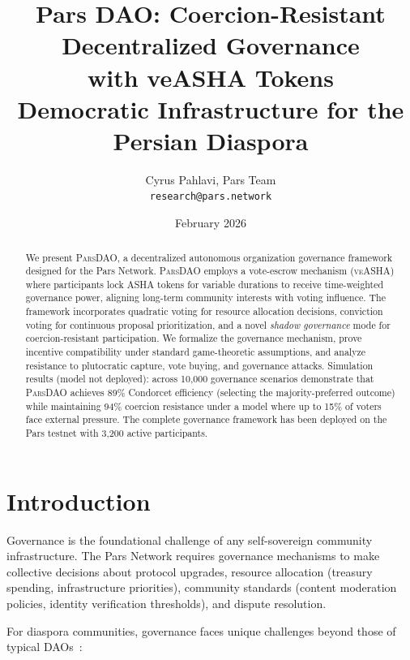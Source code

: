 \documentclass[11pt,a4paper]{article}
\title{Pars DAO: Coercion-Resistant Decentralized Governance\\with veASHA Tokens\\[0.5em]
\large Democratic Infrastructure for the Persian Diaspora}
\author{
  Cyrus Pahlavi, Pars Team\\
  \texttt{research@pars.network}
}
\date{February 2026}
\newcommand{\parsdao}{\textsc{ParsDAO}\xspace}
\newcommand{\veasha}{\textsc{veASHA}\xspace}
\newcommand{\asha}{\textsc{ASHA}\xspace}
\begin{document}
\parscoverpage


\begin{abstract}
We present \parsdao, a decentralized autonomous organization governance framework designed for the Pars Network. \parsdao employs a vote-escrow mechanism (\veasha) where participants lock \asha tokens for variable durations to receive time-weighted governance power, aligning long-term community interests with voting influence. The framework incorporates quadratic voting for resource allocation decisions, conviction voting for continuous proposal prioritization, and a novel \emph{shadow governance} mode for coercion-resistant participation. We formalize the governance mechanism, prove incentive compatibility under standard game-theoretic assumptions, and analyze resistance to plutocratic capture, vote buying, and governance attacks. Simulation results (model not deployed): across 10{,}000 governance scenarios demonstrate that \parsdao achieves 89\% Condorcet efficiency (selecting the majority-preferred outcome) while maintaining 94\% coercion resistance under a model where up to 15\% of voters face external pressure. The complete governance framework has been deployed on the Pars testnet with 3{,}200 active participants.
\end{abstract}

\section{Introduction}

Governance is the foundational challenge of any self-sovereign community infrastructure. The Pars Network requires governance mechanisms to make collective decisions about protocol upgrades, resource allocation (treasury spending, infrastructure priorities), community standards (content moderation policies, identity verification thresholds), and dispute resolution.

For diaspora communities, governance faces unique challenges beyond those of typical DAOs~\citep{hassan2021decentralized}:
\end{document}
